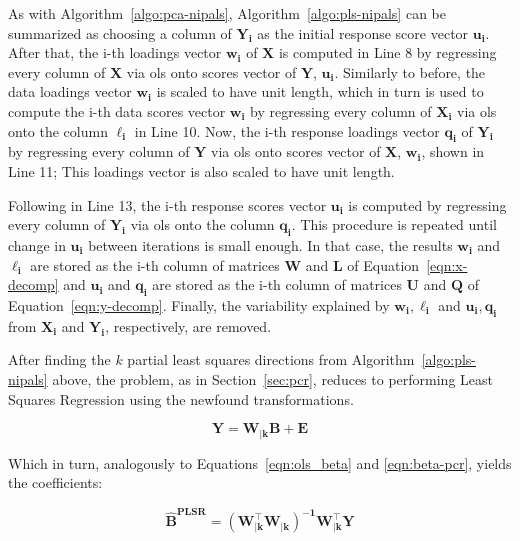 As with Algorithm~\ref{algo:pca-nipals}, Algorithm~\ref{algo:pls-nipals} can be summarized as choosing a column of $\mathbf{Y_i}$ as the initial response score vector $\mathbf{u_i}$. After that, the i-th loadings vector $\mathbf{w_i}$  of $\mathbf{X}$ is computed in Line 8 by regressing every column of $\mathbf{X}$ via \acrshort{ols} onto scores vector of $\mathbf{Y}$, $\mathbf{u_i}$. Similarly to before, the data loadings vector $\mathbf{w_i}$ is scaled to have unit length, which in turn is used to compute the i-th data scores vector $\mathbf{w_i}$ by regressing every column of $\mathbf{X_i}$ via \acrshort{ols} onto the column $\mathbf{\ell_i}$ in Line 10. Now, the i-th response loadings vector $\mathbf{q_i}$  of $\mathbf{Y_i}$  by regressing every column of $\mathbf{Y}$ via \acrshort{ols} onto scores vector of $\mathbf{X}$, $\mathbf{w_i}$, shown in Line 11; This loadings vector is also scaled to have unit length. 

Following in Line 13, the i-th response scores vector $\mathbf{u_i}$ is computed by regressing every column of $\mathbf{Y_i}$ via \acrshort{ols} onto the column $\mathbf{q_i}$. This procedure is repeated until change in $\mathbf{u_i}$ between iterations is small enough. In that case, the results $\mathbf{w_i}$ and $\mathbf{\ell_i}$ are stored as the i-th column of matrices $\mathbf{W}$ and $\mathbf{L}$ of Equation~\ref{eqn:x-decomp} and $\mathbf{u_i}$ and $\mathbf{q_i}$ are stored as the i-th column of matrices $\mathbf{U}$ and $\mathbf{Q}$ of Equation~\ref{eqn:y-decomp}. Finally, the variability explained by $\mathbf{w_i, \ell_i}$ and $\mathbf{u_i, q_i}$ from $\mathbf{X_i}$ and $\mathbf{Y_i}$, respectively, are removed.

After finding the $k$ partial least squares directions from Algorithm~\ref{algo:pls-nipals} above, the problem, as in Section~\ref{sec:pcr}, reduces to performing Least Squares Regression using the newfound transformations.

	\begin{equation}
	\label{eqn:plsr}
	\mathbf{Y = W_{|k} B + E}
\end{equation}

Which in turn, analogously to Equations~\ref{eqn:ols_beta} and \ref{eqn:beta-pcr}, yields the coefficients:

\begin{equation}
	\label{eqn:beta-plsr}
	\mathbf{\hat{B}^{\text{PLSR}} = (W_{|k}^\intercal W_{|k})^{-1}W_{|k}^\intercal Y}
\end{equation}

